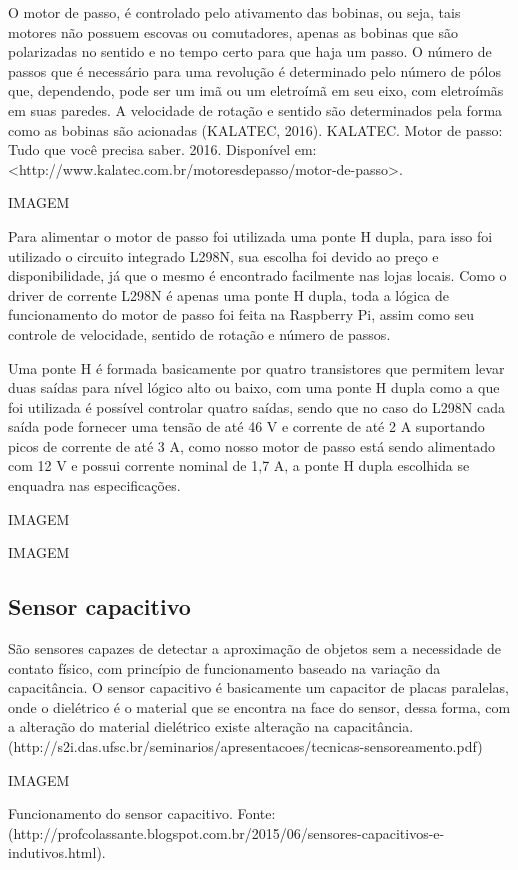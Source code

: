 O motor de passo, é controlado pelo ativamento das bobinas, ou seja, tais motores não possuem escovas ou comutadores, apenas as bobinas que são polarizadas no sentido e no tempo certo para que haja um passo. O número de passos que é necessário para uma revolução é determinado pelo número de pólos que, dependendo, pode ser um imã ou um eletroímã em seu eixo, com eletroímãs em suas paredes. A velocidade de rotação e sentido são determinados pela forma como as bobinas são acionadas (KALATEC, 2016). KALATEC. Motor de passo: Tudo que você precisa saber. 2016. Disponível em: <http://www.kalatec.com.br/motoresdepasso/motor-de-passo>.

IMAGEM

Para alimentar o motor de passo foi utilizada uma ponte H dupla, para isso foi utilizado o circuito integrado L298N, sua escolha foi devido ao preço e disponibilidade, já que o mesmo é encontrado facilmente nas lojas locais. Como o driver de corrente L298N é apenas uma ponte H dupla, toda a lógica de funcionamento do motor de passo foi feita na Raspberry Pi, assim como seu controle de velocidade, sentido de rotação e número de passos. 

Uma ponte H é formada basicamente por quatro transistores que permitem levar duas saídas para nível lógico alto ou baixo, com uma ponte H dupla como a que foi utilizada é possível controlar quatro saídas, sendo que no caso do L298N cada saída pode fornecer uma tensão de até 46 V e corrente de até 2 A suportando picos de corrente de até 3 A, como nosso motor de passo está sendo alimentado com 12 V e possui corrente nominal de 1,7 A, a ponte H dupla escolhida se enquadra nas especificações. 

IMAGEM

IMAGEM

\subsection{Sensor capacitivo}
São sensores capazes de detectar a aproximação de objetos sem a necessidade de contato físico, com princípio de funcionamento baseado na variação da capacitância. O sensor capacitivo é basicamente um capacitor de placas paralelas, onde o dielétrico é o material que se encontra na face do sensor, dessa forma, com a alteração do material dielétrico existe alteração na capacitância. (http://s2i.das.ufsc.br/seminarios/apresentacoes/tecnicas-sensoreamento.pdf)

IMAGEM

Funcionamento do sensor capacitivo. Fonte: (http://profcolassante.blogspot.com.br/2015/06/sensores-capacitivos-e-indutivos.html).

